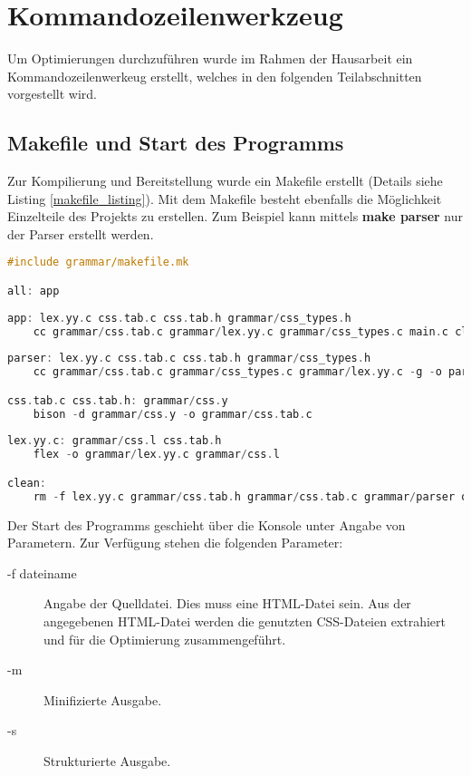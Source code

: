 \section{Kommandozeilenwerkzeug}
Um Optimierungen durchzuführen wurde im Rahmen der Hausarbeit ein Kommandozeilenwerkeug erstellt, welches in den folgenden Teilabschnitten vorgestellt wird.

\subsection{Makefile und Start des Programms}
Zur Kompilierung und Bereitstellung wurde ein Makefile erstellt (Details siehe Listing \ref{makefile_listing}). Mit dem Makefile besteht ebenfalls die Möglichkeit Einzelteile des Projekts zu erstellen. Zum Beispiel kann mittels \textbf{make parser} nur der Parser erstellt werden.

\begin{lstlisting}[label=makefile_listing,language=C, caption=Makefile]
#include grammar/makefile.mk

all: app
	
app: lex.yy.c css.tab.c css.tab.h grammar/css_types.h
	cc grammar/css.tab.c grammar/lex.yy.c grammar/css_types.c main.c cli_parse.c css_merge.c optimizer.c output.c -o optimCSS
	
parser: lex.yy.c css.tab.c css.tab.h grammar/css_types.h
	cc grammar/css.tab.c grammar/css_types.c grammar/lex.yy.c -g -o parser

css.tab.c css.tab.h: grammar/css.y
	bison -d grammar/css.y -o grammar/css.tab.c
            
lex.yy.c: grammar/css.l css.tab.h
	flex -o grammar/lex.yy.c grammar/css.l

clean: 
	rm -f lex.yy.c grammar/css.tab.h grammar/css.tab.c grammar/parser optimCSS

\end{lstlisting}

Der Start des Programms geschieht über die Konsole unter Angabe von Parametern. Zur Verfügung stehen die folgenden Parameter:

\begin{description}
   \item[ -f dateiname] Angabe der Quelldatei. Dies muss eine HTML-Datei sein. Aus der angegebenen HTML-Datei werden die genutzten CSS-Dateien extrahiert und für die Optimierung zusammengeführt.
   \item[ -m] Minifizierte Ausgabe.
   \item[ -s] Strukturierte Ausgabe.
\end{description}

